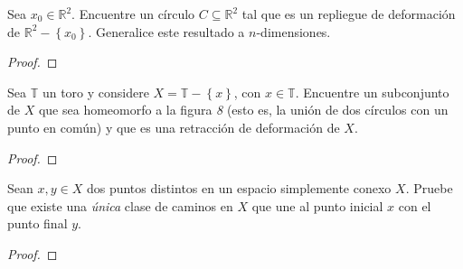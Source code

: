\documentclass[12pt]{report}
\theoremstyle{largebreak}
\begin{document}
    \begin{excer}
        Sea $x_0\in\mathbb{R}^2$. Encuentre un círculo $C\subseteq\mathbb{R}^2$ tal que es un repliegue de deformación de $\mathbb{R}^2-\left\{x_0\right\}$. Generalice este resultado a $n$-dimensiones.
    \end{excer}

    \begin{proof}
        
    \end{proof}

    \begin{excer}
        Sea $\mathbb{T}$ un toro y considere $X=\mathbb{T}-\left\{x\right\}$, con $x\in\mathbb{T}$. Encuentre un subconjunto de $X$ que sea homeomorfo a la figura \textit{8} (esto es, la unión de dos círculos con un punto en común) y que es una retracción de deformación de $X$.
    \end{excer}

    \begin{proof}
        
    \end{proof}

    \begin{excer}
        Sean $x,y\in X$ dos puntos distintos en un espacio simplemente conexo $X$. Pruebe que existe una \textit{única} clase de caminos en $X$ que une al punto inicial $x$ con el punto final $y$.
    \end{excer}

    \begin{proof}
        
    \end{proof}
\end{document}
